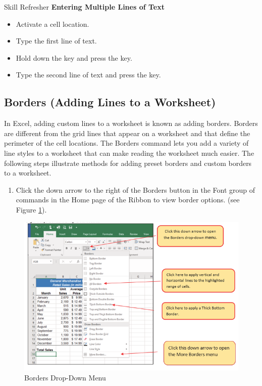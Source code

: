 \begin{center}
	\begin{sklbox}{Skill Refresher}
		\textbf{Entering Multiple Lines of Text}
		\\
		\begin{itemize}
			\setlength{\itemsep}{0pt}
			\setlength{\parskip}{0pt}
			\setlength{\parsep}{0pt}
			
			\item Activate a cell location.
			\item Type the first line of text.
			\item Hold down the  key and press the  key.
			\item Type the second line of text and press the  key.
			
		\end{itemize}
	\end{sklbox}
\end{center}

\subsection{Borders (Adding Lines to a Worksheet)}

In Excel, adding custom lines to a worksheet is known as adding borders. Borders are different from the grid lines that appear on a worksheet and that define the perimeter of the cell locations. The Borders command lets you add a variety of line styles to a worksheet that can make reading the worksheet much easier. The following steps illustrate methods for adding preset borders and custom borders to a worksheet.

\begin{enumerate}
	\item Click the down arrow to the right of the Borders button in the Font group of commands in the Home page of the Ribbon to view border options. (see Figure \ref{01:fig42}).
\end{enumerate}

\begin{figure}[H]
	\centering
	\includegraphics[width=\maxwidth{.95\linewidth}]{gfx/ch01_fig42}
	\caption{Borders Drop-Down Menu}
	\label{01:fig42}
\end{figure}

